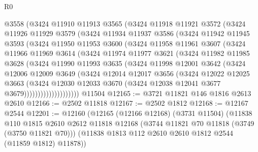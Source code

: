 \begin{lexlean}{R0}
\begin{coremodule}
          @3558
          (@3424
            @11910
            @11913
            @3565
            (@3424
              @11918
              @11921
              @3572
              (@3424
                @11926
                @11929
                @3579
                (@3424
                  @11934
                  @11937
                  @3586
                  (@3424
                    @11942
                    @11945
                    @3593
                    (@3424
                      @11950
                      @11953
                      @3600
                      (@3424
                        @11958
                        @11961
                        @3607
                        (@3424
                          @11966
                          @11969
                          @3614
                          (@3424
                            @11974
                            @11977
                            @3621
                            (@3424
                              @11982
                              @11985
                              @3628
                              (@3424
                                @11990
                                @11993
                                @3635
                                (@3424
                                  @11998
                                  @12001
                                  @3642
                                  (@3424
                                    @12006
                                    @12009
                                    @3649
                                    (@3424
                                      @12014
                                      @12017
                                      @3656
                                      (@3424
                                        @12022
                                        @12025
                                        @3663
                                        (@3424
                                          @12030
                                          @12033
                                          @3670
                                          (@3424 @12038 @12041 @3677 @3679))))))))))))))))))))
    @11504
@12165 := @3721 @11821 @146 @1816 @2613 @2610
@12166 := @2502 @11818
@12167 := @2502 @1812
@12168 := @12167 @2544
@12201 := @12160
    (@12165
      (@12166 @12168)
      (@3731 @11504)
      (@11838
        @110
        @1815
        @2610
        @2612
        @11818
        @12168
        (@3744 @11821 @70 @11818 (@3749 (@3750 @11821 @70)))
        (@11838 @1813 @112 @2610 @2610 @1812 @2544 (@11859 @1812) @11878))

\end{coremodule}
\end{lexlean}
